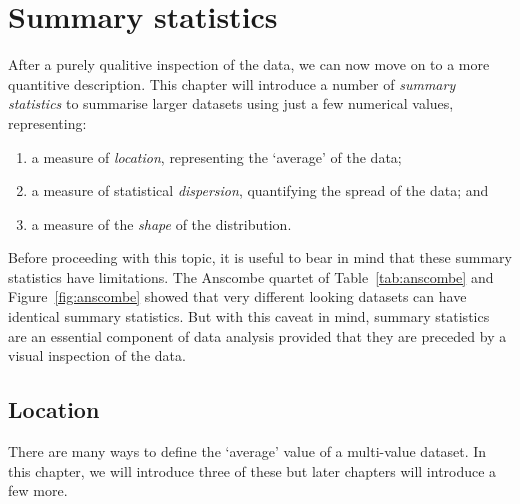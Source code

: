 \chapter{Summary statistics}
\label{ch:summary-statistics}

After a purely qualitive inspection of the data, we can now move on to
a more quantitive description. This chapter will introduce a number of
\emph{summary statistics} to summarise larger datasets using just a
few numerical values, representing:

\begin{enumerate}
  \item a measure of \emph{location}, representing the `average' of
    the data;
  \item a measure of statistical \emph{dispersion}, quantifying the
    spread of the data; and
  \item a measure of the \emph{shape} of the distribution.
\end{enumerate}

Before proceeding with this topic, it is useful to bear in mind that
these summary statistics have limitations.  The Anscombe quartet of
Table~\ref{tab:anscombe} and Figure~\ref{fig:anscombe} showed that
very different looking datasets can have identical summary
statistics. But with this caveat in mind, summary statistics are an
essential component of data analysis provided that they are preceded
by a visual inspection of the data.

\section{Location}
\label{sec:location}

There are many ways to define the `average' value of a multi-value
dataset.  In this chapter, we will introduce three of these but later
chapters will introduce a few more.

